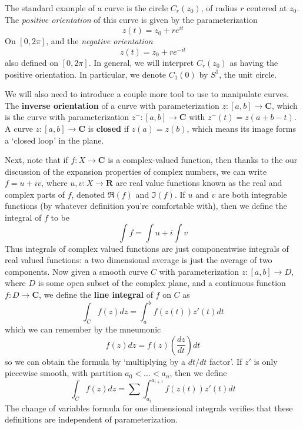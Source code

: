 \begin{example}
    The standard example of a curve is the circle $C_r(z_0)$, of radius $r$ centered at $z_0$. The {\it positive orientation} of this curve is given by the parameterization
    \[ z(t) = z_0 + re^{it} \]
    On $[0,2\pi]$, and the {\it negative orientation}
    \[ z(t) = z_0 + re^{-it} \]
    also defined on $[0,2\pi]$. In general, we will interpret $C_r(z_0)$ as having the positive orientation. In particular, we denote $C_1(0)$ by $S^1$, the unit circle.
\end{example}

We will also need to introduce a couple more tool to use to manipulate curves. The {\bf inverse orientation} of a curve with parameterization $z: [a,b] \to \mathbf{C}$, which is the curve with parameterization $z^-: [a,b] \to \mathbf{C}$ with $z^-(t) = z(a+b-t)$. A curve $z: [a,b] \to \mathbf{C}$ is {\bf closed} if $z(a) = z(b)$, which means its image forms a `closed loop' in the plane.

Next, note that if $f: X \to \mathbf{C}$ is a complex-valued function, then thanks to the our discussion of the expansion properties of complex numbers, we can write $f = u + iv$, where $u,v: X \to \mathbf{R}$ are real value functions known as the real and complex parts of $f$, denoted $\Re(f)$ and $\Im(f)$. If $u$ and $v$ are both integrable functions (by whatever definition you're comfortable with), then we define the integral of $f$ to be
%
\[ \int f = \int u + i \int v \]
%
Thus integrals of complex valued functions are just componentwise integrals of real valued functions: a two dimensional average is just the average of two components. Now given a smooth curve $C$ with parameterization $z: [a,b] \to D$, where $D$ is some open subset of the complex plane, and a continuous function $f: D \to \mathbf{C}$, we define the {\bf line integral} of $f$ on $C$ as
%
\[ \int_C f(z) dz = \int_a^b f(z(t)) z'(t) dt \]
%
which we can remember by the mneumonic
%
\[ f(z) dz = f(z) \left( \frac{dz}{dt} \right) dt \]
%
so we can obtain the formula by `multiplying by a $dt/dt$ factor'. If $z'$ is only piecewise smooth, with partition $a_0 < \dots < a_n$, then we define
%
\[ \int_C f(z) dz = \sum \int_{a_i}^{a_{i+1}} f(z(t)) z'(t) dt \]
%
The change of variables formula for one dimensional integrals verifies that these definitions are independent of parameterization.

